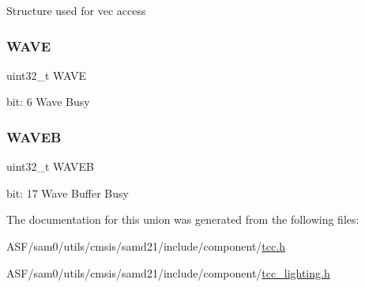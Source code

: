 Structure used for vec access \mbox{\label{union_t_c_c___s_y_n_c_b_u_s_y___type_af8b296eb513c277beb5dd7f7cfa18d1b}} 
\subsubsection{\texorpdfstring{WAVE}{WAVE}}
{\footnotesize\ttfamily uint32\+\_\+t W\+A\+VE}

bit\+: 6 Wave Busy \mbox{\label{union_t_c_c___s_y_n_c_b_u_s_y___type_a87875cf5e62b2bd58714ee21c558c59f}} 
\subsubsection{\texorpdfstring{WAVEB}{WAVEB}}
{\footnotesize\ttfamily uint32\+\_\+t W\+A\+V\+EB}

bit\+: 17 Wave Buffer Busy 

The documentation for this union was generated from the following files\+:\begin{DoxyCompactItemize}
\item 
A\+S\+F/sam0/utils/cmsis/samd21/include/component/\mbox{\hyperlink{tcc_8h}{tcc.\+h}}\item 
A\+S\+F/sam0/utils/cmsis/samd21/include/component/\mbox{\hyperlink{tcc__lighting_8h}{tcc\+\_\+lighting.\+h}}\end{DoxyCompactItemize}
